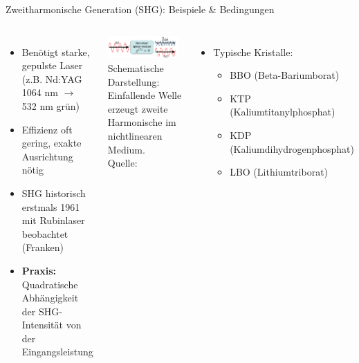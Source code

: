\documentclass[aspectratio=169]{beamer} %
\newcommand{\figcite}[1]{\\[-3mm]{\tiny Quelle: \cite{#1}}}
\begin{document}
\begin{frame}{Zweitharmonische Generation (SHG): Beispiele \& Bedingungen}
  \begin{columns}[T,onlytextwidth]
      \begin{itemize}
        \item Benötigt starke, gepulste Laser (z.B. Nd:YAG 1064 nm $\rightarrow$ 532 nm grün)
        \item Effizienz oft gering, exakte Ausrichtung nötig
        \item SHG historisch erstmals 1961 mit Rubinlaser beobachtet (Franken)
        \item \textbf{Praxis:} Quadratische Abhängigkeit der SHG-Intensität von der Eingangsleistung
      \end{itemize}
      \includegraphics[width=0.95\textwidth]{Images/Schematic_of_the_SHG_conversion_of_an_excited_wave_in_a_non-linear_medium.png}\\
      {\tiny Schematische Darstellung: Einfallende Welle erzeugt zweite Harmonische im nichtlinearen Medium. \figcite{BPAegirsson2017}}
      \pause
      \begin{itemize}
        \item Typische Kristalle: 
          \begin{itemize}
            \item BBO (Beta-Bariumborat)
            \item KTP (Kaliumtitanylphosphat)
            \item KDP (Kaliumdihydrogenphosphat)
            \item LBO (Lithiumtriborat)
          \end{itemize}
      \end{itemize}
  \end{columns}
\end{frame}
\end{document}
